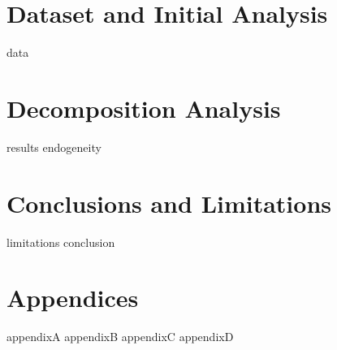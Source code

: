 \documentclass[openany,a4paper,12pt]{book}
\begin{document}
\chapter{Dataset and Initial Analysis} %
\label{sec:Dataset}
{data}

\chapter{Decomposition Analysis} %
\label{sec:Analysis}
{results} %
{endogeneity} %

\chapter{Conclusions and Limitations} %
\label{sec:Limitations}
{limitations} %
{conclusion} %
\label{sec:Bibliography}

\chapter{Appendices}
\label{sec:appendices}
\newpage
{appendixA}
\newpage
{appendixB}
\newpage
{appendixC}
\newpage
{appendixD}

\backmatter


\printglossary[type=\acronymtype, nonumberlist]
\end{document}
